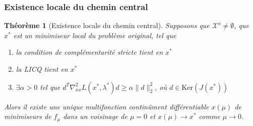 \documentclass[usepdftitle=false,aspectratio=169]{beamer}
\newtheorem{thm}{Théorème}
\def\cX{\mathcal{X}}
\begin{document}
\begin{frame}
\frametitle{Existence locale du chemin central}

\begin{thm}[Existence locale du chemin central]
Supposons que $\cX^o \ne \emptyset$, que $x^*$ est un minimiseur local du problème original, tel que
\begin{enumerate}
\item
la condition de complémentarité stricte tient en $x^*$
\item
la LICQ tient en $x^*$
\item
$\exists \alpha > 0$ tel que $d^T \nabla_{xx}^2 L(x^*, \lambda^*) d \geq \alpha \| d \|_2^2$, où $d \in \mbox{Ker}(J(x^*))$
\end{enumerate}
Alors il existe une unique multifonction continûment différentiable $x(\mu)$ de minimiseurs de $f_{\mu}$ dans un voisinage de $\mu = 0$ et $x(\mu) \rightarrow x^*$ comme $\mu \rightarrow 0$.
\end{thm}

\end{frame}
\end{document}
